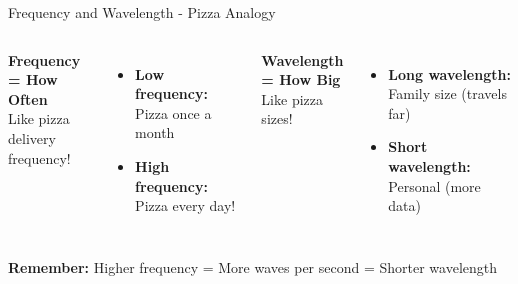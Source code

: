 \documentclass[aspectratio=169,11pt]{beamer}
\begin{document}
\begin{frame}{Frequency and Wavelength - Pizza Analogy}
\begin{columns}
\textbf{\Large Frequency = How Often}\\
Like pizza delivery frequency!
\begin{itemize}
    \item \textbf{Low frequency:} Pizza once a month
    \item \textbf{High frequency:} Pizza every day!
\end{itemize}
\vspace{1em}
\textbf{\Large Wavelength = How Big}\\
Like pizza sizes!
\begin{itemize}
    \item \textbf{Long wavelength:} Family size (travels far)
    \item \textbf{Short wavelength:} Personal (more data)
\end{itemize}

\end{columns}
\vspace{1em}
\begin{center}\colorbox{yellow!20}{\parbox{0.9\textwidth}{
\textbf{Remember:} Higher frequency = More waves per second = Shorter wavelength
}}\end{center}
\end{frame}
\end{document}
